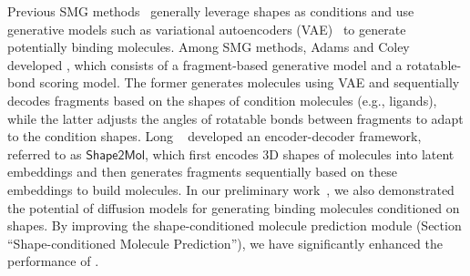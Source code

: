 %
%
%
Previous SMG methods~\cite{long2022zero, adams2023equivariant} generally leverage shapes as conditions and use generative models such as variational autoencoders (VAE)~\cite{kingma2013auto} to generate potentially binding molecules.  
%
Among SMG methods, Adams and Coley~\cite{adams2023equivariant} developed \squid, which consists of a fragment-based generative model and a rotatable-bond scoring model.
%
The former generates molecules using VAE and sequentially decodes fragments based on the shapes of condition molecules (e.g., ligands), while the latter adjusts the angles of rotatable bonds between fragments to adapt to the condition shapes.
%
%
Long \etal~\cite{long2022zero} developed an encoder-decoder framework, referred to as $\mathsf{Shape2Mol}$, which first encodes 3D shapes of molecules into latent embeddings and then generates fragments sequentially based on these embeddings to build molecules.
%
{In our preliminary work~\cite{Chen2023ShapeMol}, we also demonstrated the potential of diffusion models for generating binding molecules conditioned on shapes. 
%
By improving the shape-conditioned molecule prediction module (Section ``Shape-conditioned Molecule Prediction''), we have significantly enhanced the performance of \method.}


